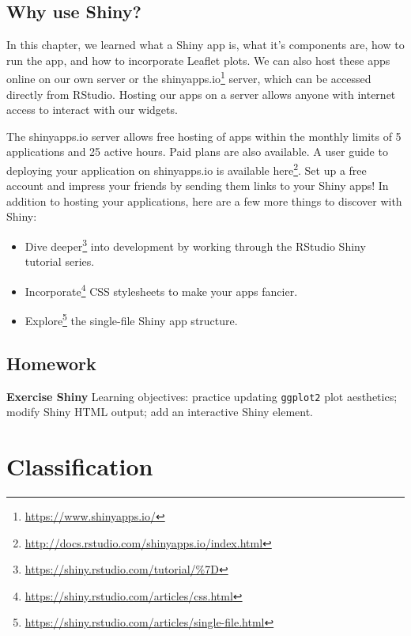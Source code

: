 \documentclass[]{krantz}
\providecommand{\tightlist}{%
  \setlength{\itemsep}{0pt}\setlength{\parskip}{0pt}}
\renewcommand{\href}[2]{#2\footnote{\url{#1}}}
\begin{document}
\hypertarget{why-use-shiny}{%
\section{Why use Shiny?}\label{why-use-shiny}}

In this chapter, we learned what a Shiny app is, what it's components are, how to run the app, and how to incorporate Leaflet plots. We can also host these apps online on our own server or the \href{https://www.shinyapps.io/}{shinyapps.io} server, which can be accessed directly from RStudio. Hosting our apps on a server allows anyone with internet access to interact with our widgets.

The shinyapps.io server allows free hosting of apps within the monthly limits of 5 applications and 25 active hours. Paid plans are also available. A user guide to deploying your application on shinyapps.io is available \href{http://docs.rstudio.com/shinyapps.io/index.html}{here}. Set up a free account and impress your friends by sending them links to your Shiny apps! In addition to hosting your applications, here are a few more things to discover with Shiny:

\begin{itemize}
\tightlist
\item
  \href{https://shiny.rstudio.com/tutorial/\%7D}{Dive deeper} into development by working through the RStudio Shiny tutorial series.
\item
  \href{https://shiny.rstudio.com/articles/css.html}{Incorporate} CSS stylesheets to make your apps fancier.
\item
  \href{https://shiny.rstudio.com/articles/single-file.html}{Explore} the single-file Shiny app structure.
\end{itemize}

\hypertarget{homework-5}{%
\section{Homework}\label{homework-5}}

\textbf{Exercise Shiny} Learning objectives: practice updating \texttt{ggplot2} plot aesthetics; modify Shiny HTML output; add an interactive Shiny element.

\hypertarget{classification}{%
\chapter{Classification}\label{classification}}
\end{document}
